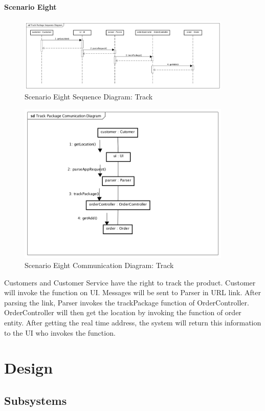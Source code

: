 \documentclass[12pt]{scrreprt}
\begin{document}
\subsubsection{Scenario Eight}
\begin{figure}[H]
  \centering\includegraphics[width=4in]{DocumentRes/8SequenceDiagram_track.png}
  \caption{Scenario Eight Sequence Diagram: Track}
\end{figure}
\begin{figure}[H]
  \centering\includegraphics[width=4in]{DocumentRes/8CommunicationDiagram_track.png}
  \caption{Scenario Eight Communication Diagram: Track}
\end{figure}
Customers and Customer Service have the right to track the product. Customer will invoke the function on UI. Messages will be sent to Parser in URL link. After parsing the link, Parser invokes the trackPackage function of OrderController. OrderController will then get the location by invoking the function of order entity. After getting the real time address, the system will return this information to the UI who invokes the function.

\chapter{Design}
\section{Subsystems}
\end{document}
